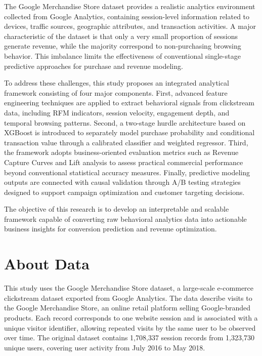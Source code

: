 \documentclass[conference]{IEEEtran}
\begin{document}
The Google Merchandise Store dataset provides a realistic
analytics environment collected from Google Analytics,
containing session-level information related to devices,
traffic sources, geographic attributes, and transaction
activities. A major characteristic of the dataset is that
only a very small proportion of sessions generate revenue,
while the majority correspond to non-purchasing browsing
behavior. This imbalance limits the effectiveness of
conventional single-stage predictive approaches for purchase
and revenue modeling.

To address these challenges, this study proposes an
integrated analytical framework consisting of four major
components. First, advanced feature engineering techniques
are applied to extract behavioral signals from clickstream
data, including RFM indicators, session velocity,
engagement depth, and temporal browsing patterns. Second,
a two-stage hurdle architecture based on XGBoost is
introduced to separately model purchase probability and
conditional transaction value through a calibrated
classifier and weighted regressor. Third, the framework
adopts business-oriented evaluation metrics such as Revenue
Capture Curves and Lift analysis to assess practical
commercial performance beyond conventional statistical
accuracy measures. Finally, predictive modeling outputs are
connected with causal validation through A/B testing
strategies designed to support campaign optimization and
customer targeting decisions.

The objective of this research is to develop an
interpretable and scalable framework capable of converting
raw behavioral analytics data into actionable business
insights for conversion prediction and revenue optimization.
\section{About Data}

This study uses the Google Merchandise Store dataset, a large-scale e-commerce clickstream dataset exported from Google Analytics. The data describe visits to the Google Merchandise Store, an online retail platform selling Google-branded products. Each record corresponds to one website session and is associated with a unique visitor identifier, allowing repeated visits by the same user to be observed over time. The original dataset contains 1,708,337 session records from 1,323,730 unique users, covering user activity from July 2016 to May 2018.
\end{document}
